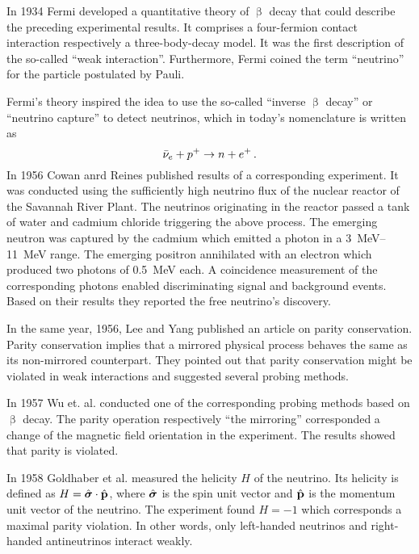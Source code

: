     In 1934 Fermi developed a quantitative theory of $\upbeta$ decay that could describe the preceding experimental results. It comprises a four-fermion contact interaction respectively a three-body-decay model. It was the first description of the so-called ``weak interaction''. Furthermore, Fermi coined the term ``neutrino'' for the particle postulated by Pauli. \cite{Fermi1934}
    
    Fermi's theory inspired the idea to use the so-called ``inverse $\upbeta$ decay'' or ``neutrino capture'' to detect neutrinos, which in today's nomenclature is written as
    \begin{equation*}
        \bar{\nu}_{e} + p^+ \rightarrow n + e^+ \text{\,.}
    \end{equation*}
    In 1956 Cowan anrd Reines published results of a corresponding experiment. It was conducted using the sufficiently high neutrino flux of the nuclear reactor of the Savannah River Plant. The neutrinos originating in the reactor passed a tank of water and cadmium chloride triggering the above process. The emerging neutron was captured by the cadmium which emitted a photon in a \SIrange{3}{11}{MeV} range. The emerging positron annihilated with an electron which produced two photons of \SI{0.5}{MeV} each. A coincidence measurement of the corresponding photons enabled discriminating signal and background events. Based on their results they reported the free neutrino's discovery. \cite{Cowan103}
    
    In the same year, 1956, Lee and Yang published an article on parity conservation. Parity conservation implies that a mirrored physical process behaves the same as its non-mirrored counterpart. They pointed out that parity conservation might be violated in weak interactions and suggested several probing methods. \cite{Lee1956}
    
    In 1957 Wu et. al. conducted one of the corresponding probing methods based on $\upbeta$ decay. The parity operation respectively ``the mirroring'' corresponded a change of the magnetic field orientation in the experiment. The results showed that parity is violated. \cite{Wu1957}
    
    In 1958 Goldhaber et al. measured the helicity $H$ of the neutrino. Its helicity is defined as $ H = \hat{\boldsymbol{\mathbf{\sigma}}} \cdot \hat{\boldsymbol{\mathbf{p}}}$, where $\hat{\boldsymbol{\mathbf{\sigma}}}$ is the spin unit vector and $\hat{\boldsymbol{\mathbf{p}}}$ is the momentum unit vector of the neutrino. The experiment found $H = -1$ which corresponds a maximal parity violation. In other words, only left-handed neutrinos and right-handed antineutrinos interact weakly.~\cite{Goldhaber1958}
    
